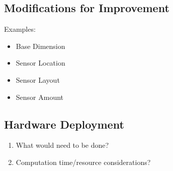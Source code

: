 \documentclass[10pt,journal,compsoc]{IEEEtran}
\begin{document}
\subsection{Modifications for Improvement}
Examples:
\begin{itemize}
\item Base Dimension
\item Sensor Location
\item Sensor Layout
\item Sensor Amount
\end{itemize}

\subsection{Hardware Deployment}
\begin{enumerate}
\item What would need to be done?
\item Computation time/resource considerations?
\end{enumerate}



\end{document}
